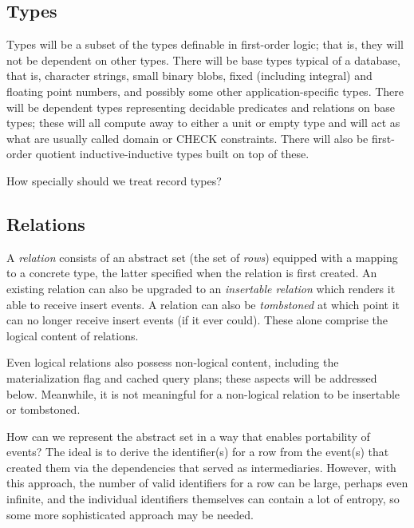 \documentclass{article}
\begin{document}
\subsection{Types}

Types will be a subset of the types definable in first-order logic; that is, they will not be dependent on other types.  There will be base types typical of a database, that is, character strings, small binary blobs, fixed (including integral) and floating point numbers, and possibly some other application-specific types.  There will be dependent types representing decidable predicates and relations on base types; these will all compute away to either a unit or empty type and will act as what are usually called domain or CHECK constraints.  There will also be first-order quotient inductive-inductive types built on top of these.

\begin{question}
	How specially should we treat record types?
\end{question}

\subsection{Relations}

A \emph{relation} consists of an abstract set (the set of \emph{rows}) equipped with a mapping to a concrete type, the latter specified when the relation is first created.  An existing relation can also be upgraded to an \emph{insertable relation} which renders it able to receive insert events.  A relation can also be \emph{tombstoned} at which point it can no longer receive insert events (if it ever could).  These alone comprise the logical content of relations.

Even logical relations also possess non-logical content, including the materialization flag and cached query plans; these aspects will be addressed below.  Meanwhile, it is not meaningful for a non-logical relation to be insertable or tombstoned.

\begin{question}
	How can we represent the abstract set in a way that enables portability of events?  The ideal is to derive the identifier(s) for a row from the event(s) that created them via the dependencies that served as intermediaries.  However, with this approach, the number of valid identifiers for a row can be large, perhaps even infinite, and the individual identifiers themselves can contain a lot of entropy, so some more sophisticated approach may be needed.
\end{question}
\end{document}
